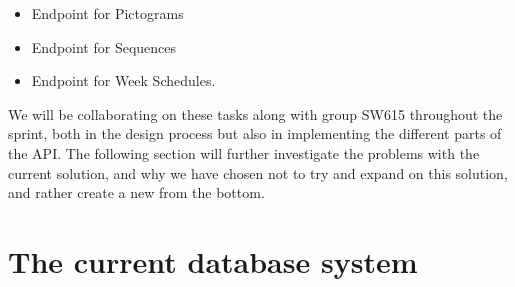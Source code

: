 \begin{itemize}
	\item Endpoint for Pictograms
	\item Endpoint for Sequences
	\item Endpoint for Week Schedules.
\end{itemize}

We will be collaborating on these tasks along with group SW615 throughout the sprint, both in the design process but also in implementing the different parts of the API.
The following section will further investigate the problems with the current solution, and why we have chosen not to try and expand on this solution, and rather create a new from the bottom.

\section{The current database system}
%
%
